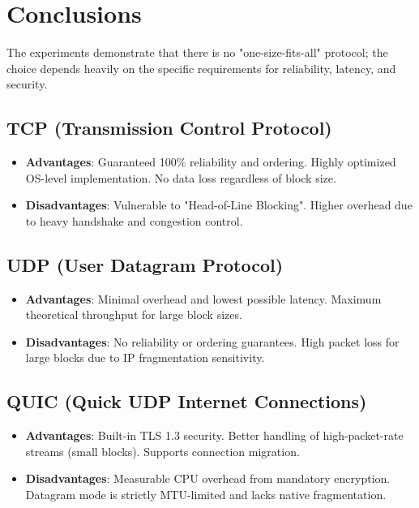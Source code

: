 \documentclass{article}
\begin{document}
\section{Conclusions}
The experiments demonstrate that there is no "one-size-fits-all" protocol; the choice depends heavily on the specific requirements for reliability, latency, and security.

\subsection{TCP (Transmission Control Protocol)}
\begin{itemize}
    \item \textbf{Advantages}: Guaranteed 100\% reliability and ordering. Highly optimized OS-level implementation. No data loss regardless of block size.
    \item \textbf{Disadvantages}: Vulnerable to "Head-of-Line Blocking". Higher overhead due to heavy handshake and congestion control.

\end{itemize}

\subsection{UDP (User Datagram Protocol)}
\begin{itemize}
    \item \textbf{Advantages}: Minimal overhead and lowest possible latency. Maximum theoretical throughput for large block sizes.
    \item \textbf{Disadvantages}: No reliability or ordering guarantees. High packet loss for large blocks due to IP fragmentation sensitivity.
\end{itemize}

\subsection{QUIC (Quick UDP Internet Connections)}
\begin{itemize}
    \item \textbf{Advantages}: Built-in TLS 1.3 security. Better handling of high-packet-rate streams (small blocks). Supports connection migration.
    \item \textbf{Disadvantages}: Measurable CPU overhead from mandatory encryption. Datagram mode is strictly MTU-limited and lacks native fragmentation.

\end{itemize}
\end{document}
